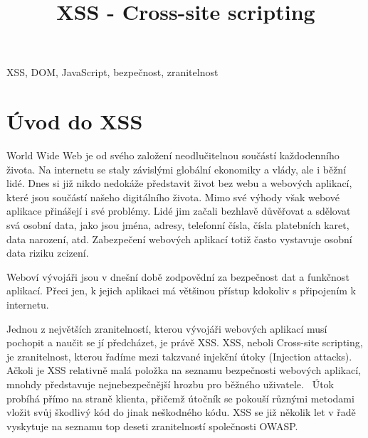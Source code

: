 \documentclass[11pt, conference, a4paper]{IEEEtran}
\begin{document}
\title{XSS \-- Cross\--site scripting}

\author{
}
\maketitle

\begin{abstract}

\end{abstract}

\begin{IEEEkeywords}
XSS, DOM, JavaScript, bezpečnost, zranitelnost
\end{IEEEkeywords}

\section{Úvod do XSS}

World Wide Web je od svého založení neodlučitelnou součástí každodenního života. Na internetu se staly závislými globální ekonomiky a vlády, ale i běžní lidé. Dnes si již nikdo nedokáže představit život bez webu a webových aplikací, které jsou součástí našeho digitálního života. Mimo své výhody však webové aplikace přinášejí i své problémy. Lidé jim začali bezhlavě důvěřovat a sdělovat svá osobní data, jako jsou jména, adresy, telefonní čísla, čísla platebních karet, data narození, atd. Zabezpečení webových aplikací totiž často vystavuje osobní data riziku zcizení. 

Weboví vývojáři jsou v dnešní době zodpovědní za bezpečnost dat a funkčnost aplikací. Přeci jen, k jejich aplikaci má většinou přístup kdokoliv s připojením k internetu.

Jednou z největších zranitelností, kterou vývojáři webových aplikací musí pochopit a naučit se jí předcházet, je právě XSS. XSS, neboli Cross-site scripting, je zranitelnost, kterou řadíme mezi takzvané injekční útoky (Injection attacks). Ačkoli je XSS relativně malá položka na seznamu bezpečnosti webových aplikací, mnohdy představuje nejnebezpečnější hrozbu pro běžného uživatele.~\cite{Grossman2007} Útok probíhá přímo na straně klienta, přičemž útočník se pokouší různými metodami vložit svůj škodlivý kód do jinak neškodného kódu. XSS se již několik let v řadě vyskytuje na seznamu top deseti zranitelností společnosti OWASP.
\end{document}
